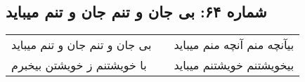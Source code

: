 \begin{center}
\section*{شماره ۶۴: بی جان و تنم جان و تنم میباید}
\label{sec:064}
\begin{longtable}{l p{0.5cm} r}
بی جان و تنم جان و تنم میباید
&&
بیآنچه منم آنچه منم میباید
\\
با خویشتنم ز خویشتن بیخبرم
&&
بیخویشتنم خویشتنم میباید
\\
\end{longtable}
\end{center}
